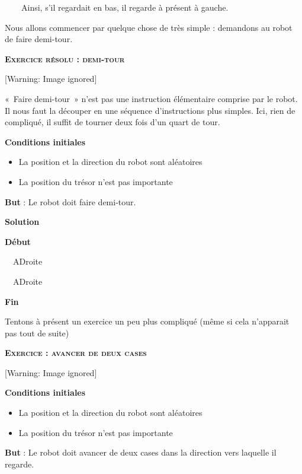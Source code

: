 {\sffamily
\ \ \ \ Ainsi, s'il regardait en bas, il regarde à
présent à gauche.}

{
Nous allons commencer par quelque chose de très simple : demandons au
robot de faire demi-tour.}

{\sffamily\bfseries\scshape
Exercice résolu : demi-tour}

\begin{center}
 [Warning: Image ignored] %

\end{center}
{
«~Faire demi-tour~» n'est pas une instruction
élémentaire comprise par le robot. Il nous faut la découper en une
séquence d'instructions plus simples. Ici, rien de
compliqué, il suffit de tourner deux fois d'un quart
de tour.}

{\bfseries
Conditions initiales}

\liststyleListv
\begin{itemize}
\item {
La position et la direction du robot sont aléatoires}
\item {
La position du trésor n'est pas importante}
\end{itemize}
{
\textbf{But} : Le robot doit faire demi-tour.}


\bigskip

{\bfseries
Solution}

{\sffamily\bfseries
Début}

{\sffamily
\ \ ADroite}

{\sffamily
\ \ ADroite}

{\sffamily\bfseries
Fin}

{
Tentons à présent un exercice un peu plus compliqué (même si cela
n'apparait pas tout de suite)}

{\sffamily\bfseries\scshape
Exercice : avancer de deux cases}

\begin{center}
 [Warning: Image ignored] %

\end{center}
{\bfseries
Conditions initiales}

\liststyleListv
\begin{itemize}
\item {
La position et la direction du robot sont aléatoires}
\item {
La position du trésor n'est pas importante}
\end{itemize}
{
\textbf{But} : Le robot doit avancer de deux cases dans la direction
vers laquelle il regarde.}


